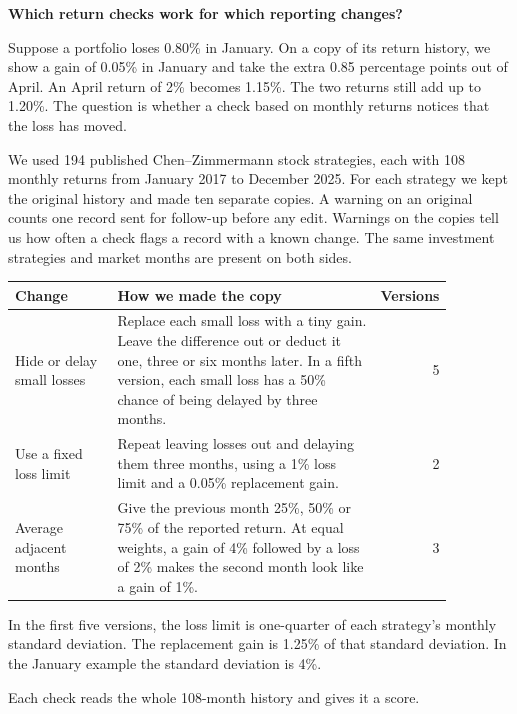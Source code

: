 \documentclass[11pt,letterpaper]{article}
\newcommand{\subhead}[1]{\vspace{3pt}{\large\bfseries #1}\par}
\begin{document}
\begin{center}{\LARGE\bfseries Which return checks work for which reporting changes?}\end{center}

\subhead{Start with the same returns and change how they are reported}
Suppose a portfolio loses 0.80\% in January. On a copy of its return history, we show a gain of 0.05\% in January and take the extra 0.85 percentage points out of April. An April return of 2\% becomes 1.15\%. The two returns still add up to 1.20\%. The question is whether a check based on monthly returns notices that the loss has moved.

We used 194 published Chen--Zimmermann stock strategies, each with 108 monthly returns from January 2017 to December 2025. For each strategy we kept the original history and made ten separate copies. A warning on an original counts one record sent for follow-up before any edit. Warnings on the copies tell us how often a check flags a record with a known change. The same investment strategies and market months are present on both sides.

\begin{center}
\begin{tabular}{@{}p{0.24\linewidth}p{0.63\linewidth}r@{}}\toprule
Change & How we made the copy & Versions\\\midrule
Hide or delay small losses &
Replace each small loss with a tiny gain. Leave the difference out or deduct it one, three or six months later. In a fifth version, each small loss has a 50\% chance of being delayed by three months. & 5\\
Use a fixed loss limit &
Repeat leaving losses out and delaying them three months, using a 1\% loss limit and a 0.05\% replacement gain. & 2\\
Average adjacent months &
Give the previous month 25\%, 50\% or 75\% of the reported return. At equal weights, a gain of 4\% followed by a loss of 2\% makes the second month look like a gain of 1\%. & 3\\\bottomrule
\end{tabular}
\end{center}
In the first five versions, the loss limit is one-quarter of each strategy's monthly standard deviation. The replacement gain is 1.25\% of that standard deviation. In the January example the standard deviation is 4\%.

\subhead{What the four letters mean}
Each check reads the whole 108-month history and gives it a score.
\end{document}
